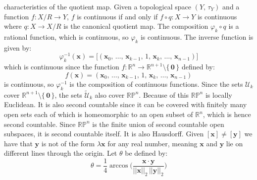 \documentclass{article}
\theoremstyle{plain}
\theoremstyle{normal}
\newenvironment{example}{%
    \pushQED{\qed}\renewcommand{\qedsymbol}{$\blacksquare$}\examplex%
}{%
    \popQED\endexamplex%
}
\begin{document}
\begin{example}[\textbf{Real Projective Space}]
            characteristics of the quotient map. Given a topological space
            $(Y,\,\tau_{Y})$ and a function $f:X/R\rightarrow{Y}$, $f$ is
            continuous if and only if $f\circ{q}:X\rightarrow{Y}$ is
            continuous where $q:X\rightarrow{X}/R$ is the canonical quotient
            map. The composition $\varphi_{k}\circ{q}$ is a rational function,
            which is continuous, so $\varphi_{k}$ is continuous. The inverse
            function is given by:
            \begin{equation}
                \varphi_{k}^{-1}(\mathbf{x})
                =\big[
                    (\mathbf{x}_{0},\,\dots,\,\mathbf{x}_{k-1},\,1,\,
                    \mathbf{x}_{k},\,\dots,\,\mathbf{x}_{n-1})
                \big]
            \end{equation}
            which is continuous since the function
            $f:\mathbb{R}^{n}\rightarrow\mathbb{R}^{n+1}\setminus\{\,\mathbf{0}\,\}$
            defined by:
            \begin{equation}
                f(\mathbf{x})=
                (\mathbf{x}_{0},\,\dots,\,\mathbf{x}_{k-1},\,1,\,
                    \mathbf{x}_{k},\,\dots,\,\mathbf{x}_{n-1})
            \end{equation}
            is continuous, so $\varphi_{k}^{-1}$ is the composition of
            continuous functions. Since the sets
            $\mathcal{U}_{k}$ cover
            $\mathbb{R}^{n+1}\setminus\{\,\mathbf{0}\,\}$, the sets
            $\tilde{\mathcal{U}}_{k}$ also cover $\mathbb{RP}^{n}$. Because of
            this $\mathbb{RP}^{n}$ is locally Euclidean. It is also second
            countable since it can be covered with finitely many open sets
            each of which is homeomorphic to an open subset of $\mathbb{R}^{n}$,
            which is hence second countable. Since $\mathbb{RP}^{n}$ is the
            finite union of second countable open subspaces, it is second
            countable itself. It is also Hausdorff. Given
            $[\mathbf{x}]\ne[\mathbf{y}]$ we have that $\mathbf{y}$ is not
            of the form $\lambda\mathbf{x}$ for any real number, meaning
            $\mathbf{x}$ and $\mathbf{y}$ lie on different lines through the
            origin. Let $\theta$ be defined by:
            \begin{equation}
                \theta=
                \frac{1}{4}\arccos\Big(
                    \frac{\mathbf{x}\cdot\mathbf{y}}
                        {||\mathbf{x}||_{2}\,||\mathbf{y}||_{2}}
                \Big)
            \end{equation}

\end{example}
\end{document}
